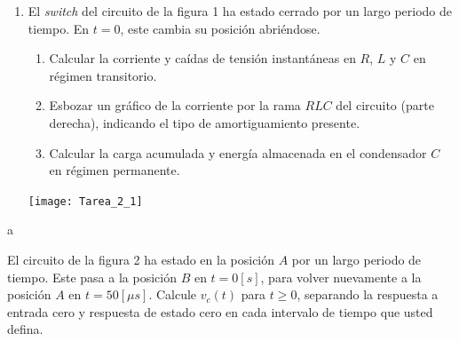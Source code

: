 \documentclass[
  11pt,
  letterpaper,
   addpoints,
  ]{exam}
\begin{document}
\begin{questions}
    \question     
    \begin{enumerate}
    \item El \textit{switch} del circuito de la figura 1 ha estado cerrado por un largo periodo de tiempo. En $t=0$, este cambia su posición abriéndose.
    \begin{enumerate}
        \item Calcular la corriente y caídas de tensión instantáneas en $R$, $L$ y $C$ en régimen transitorio.
        \item Esbozar un gráfico de la corriente por la rama $RLC$ del circuito (parte derecha), indicando el tipo de amortiguamiento presente.
        \item Calcular la carga acumulada y energía almacenada en el condensador $C$ en régimen permanente.
    \end{enumerate}
        \begin{center}
            \texttt{[image: Tarea\_2\_1]}
        \end{center}
    \end{enumerate}
    \begin{solution}
        a
    \end{solution}
    \question   El circuito de la figura 2 ha estado en la posición $A$ por un largo periodo de tiempo. Este pasa a la posición $B$ en $t=0[s]$, para volver nuevamente a la posición $A$ en $t=50[\mu s]$. Calcule $v_c(t)$ para $t\geq 0$, separando la respuesta a entrada cero y respuesta de estado cero en cada intervalo de tiempo que usted defina.


\end{questions}
\end{document}
